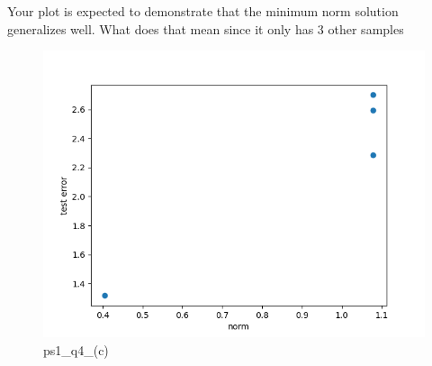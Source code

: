 
\begin{answer}

Your plot is expected to demonstrate that the minimum norm solution
generalizes well. What does that mean since it only has 3 other samples 
\begin{figure}
    \centering
    \includegraphics[width=0.5\linewidth]{ps1_q4_(c).png}
    \caption{ps1\_q4\_(c)}
    \label{fig:enter-label}
\end{figure}
\end{answer}